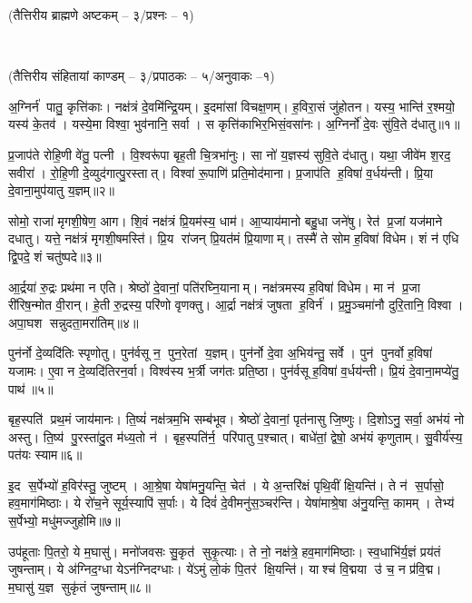 
\centerline{\normalsize(तैत्तिरीय ब्राह्मणे अष्टकम् -- ३/प्रश्नः -- १)}\mbox{}\\[-2em]
\centerline{\normalsize(तैत्तिरीय संहितायां काण्डम् -- ३/प्रपाठकः -- ५/अनुवाकः --१)}

अ॒ग्निर्न॑ पातु॒ कृत्ति॑काः। नक्ष॑त्रं दे॒वमि॑न्द्रि॒यम्। इ॒दमा॑सां विचक्ष॒णम्। ह॒विरा॒सं जु॑होतन। यस्य॒ भान्ति॑ र॒श्मयो॒ यस्य॑ के॒तव॑। यस्ये॒मा विश्वा॒ भुव॑नानि॒ सर्वा। स कृत्ति॑काभि\-र॒भिसं॒वसा॑नः। अ॒ग्निर्नो॑ दे॒वः सु॑वि॒ते द॑धातु॥१॥ 

प्र॒जाप॑ते रोहि॒णी वे॑तु॒ पत्नी। वि॒श्वरू॑पा बृह॒ती चि॒त्रभा॑नुः। सा नो॑ य॒ज्ञस्य॑ सुवि॒ते द॑धातु। यथा॒ जीवे॑म श॒रद॒ सवीरा॑। रो॒हि॒णी दे॒व्युद॑गात्पु॒रस्तात्। विश्वा॑ रू॒पाणि॑ प्रति॒मोद॑माना। प्र॒जाप॑ति ह॒विषा॑ व॒र्धय॑न्ती। प्रि॒या दे॒वाना॒मुप॑यातु य॒ज्ञम्॥२॥ 

सोमो॒ राजा॑ मृगशी॒\ar{}षेण॒ आग\snn{}। शि॒वं नक्ष॑त्रं प्रि॒यम॑स्य॒ धाम॑। आ॒प्याय॑मानो बहु॒धा जने॑षु। रेत॑ प्र॒जां यज॑माने दधातु। यत्ते॒ नक्ष॑त्रं मृगशी॒\ar{}षमस्ति॑। प्रि॒य रा॑जन् प्रि॒यत॑मं प्रि॒याणाम्। तस्मै॑ ते सोम ह॒विषा॑ विधेम। शं न॑ एधि द्वि॒पदे॒ शं चतु॑ष्पदे॥३॥ 

आ॒र्द्रया॑ रु॒द्रः प्रथ॑मा न एति। श्रेष्ठो॑ दे॒वानां॒ पति॑रघ्नि॒यानाम्। नक्ष॑त्रमस्य ह॒विषा॑ विधेम। मा न॑ प्र॒जा री॑रिष॒न्मोत वी॒रान्। हे॒ती रु॒द्रस्य॒ परि॑णो वृणक्तु। आ॒र्द्रा नक्ष॑त्रं जुषता ह॒विर्न॑। प्र॒मु॒ञ्चमा॑नौ दुरि॒तानि॒ विश्वा। अपा॒घश सन्नुदता॒मरा॑तिम्॥४॥ 

पुन॑र्नो दे॒व्यदि॑तिः स्पृणोतु। पुन॑र्वसू न॒ पुन॒रेतां य॒ज्ञम्। पुन॑र्नो दे॒वा अ॒भिय॑न्तु॒ सर्वे। पुन॑ पुनर्वो ह॒विषा॑ यजामः। ए॒वा न दे॒व्यदि॑तिरन॒र्वा। विश्व॑स्य भ॒र्त्री जग॑तः प्रति॒ष्ठा। पुन॑र्वसू ह॒विषा॑ व॒र्धय॑न्ती। प्रि॒यं दे॒वाना॒मप्ये॑तु॒ पाथ॑॥५॥ 

बृह॒स्पति॑ प्रथ॒मं जाय॑मानः। ति॒ष्यं॑ नक्ष॑त्रम॒भि सम्ब॑भूव। श्रेष्ठो॑ दे॒वानां॒ पृत॑नासु  जि॒ष्णुः। दि॒शोऽनु॒ सर्वा॒ अभ॑यं नो अस्तु। ति॒ष्य॑ पु॒रस्ता॑दु॒त म॑ध्य॒तो न॑। बृह॒स्पति॑र्न॒ परि॑पातु प॒श्चात्। बाधे॑तां॒ द्वेषो॒ अभ॑यं कृणुताम्। सु॒वीर्य॑स्य॒ पत॑यः स्याम॥६॥ 

इ॒द स॒र्पेभ्यो॑ ह॒विर॑स्तु॒ जुष्टम्। आ॒श्रे॒षा येषा॑मनु॒यन्ति॒ चेत॑। ये अ॒न्तरि॑क्षं पृथि॒वीं क्षि॒यन्ति॑। ते न॑ स॒र्पासो॒ हव॒माग॑मिष्ठाः। ये रो॑च॒ने सूर्य॒स्यापि॑ स॒र्पाः। ये दिवं॑ दे॒वीमनु॑स॒ञ्चर॑न्ति। येषा॑माश्रे॒षा अ॑नु॒यन्ति॒ कामम्। तेभ्य॑ स॒र्पेभ्यो॒ मधु॑मज्जुहोमि॥७॥ 

उप॑हूताः पि॒तरो॒ ये म॒घासु॑। मनो॑जवसः सु॒कृत॑ सुकृ॒त्याः। ते नो॒ नक्ष॑त्रे॒ हव॒माग॑मिष्ठाः। स्व॒धाभि॑र्य॒ज्ञं प्रय॑तं जुषन्ताम्। ये अ॑ग्निद॒ग्धा येऽन॑ग्निदग्धाः। ये॑ऽमुं लो॒कं पि॒तर॑ क्षि॒यन्ति॑। याश्च॑ वि॒द्मया उ॑ च॒ न प्र॑वि॒द्म। म॒घासु॑ य॒ज्ञ सुकृ॑तं जुषन्ताम्॥८॥ 

